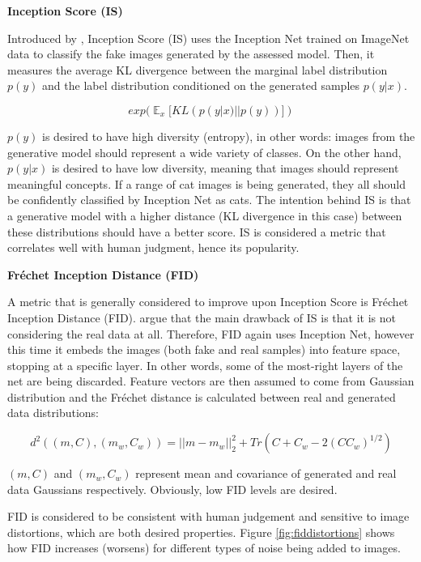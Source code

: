 \documentclass[
]{krantz}
\renewenvironment{quote}{\begin{VF}}{\end{VF}}
\begin{document}
\textbf{Inception Score (IS)}

Introduced by \citet{InceptionScore2016}, Inception Score (IS) uses the Inception Net \citep{InceptionNet2015} trained on ImageNet data to classify the fake images generated by the assessed model. Then, it measures the average KL divergence between the marginal label distribution \(p(y)\) and the label distribution conditioned on the generated samples \(p(y|x)\).

\begin{quote}
\[exp(\mathop{{}\mathbb{E}}_{x}[KL(p(y|x) || p(y))])\]
\end{quote}

\(p(y)\) is desired to have high diversity (entropy), in other words: images from the generative model should represent a wide variety of classes. On the other hand, \(p(y|x)\) is desired to have low diversity, meaning that images should represent meaningful concepts. If a range of cat images is being generated, they all should be confidently classified by Inception Net as cats. The intention behind IS is that a generative model with a higher distance (KL divergence in this case) between these distributions should have a better score. IS is considered a metric that correlates well with human judgment, hence its popularity.

\textbf{Fréchet Inception Distance (FID)}

A metric that is generally considered to improve upon Inception Score is Fréchet Inception Distance (FID). \citet{FID2017} argue that the main drawback of IS is that it is not considering the real data at all. Therefore, FID again uses Inception Net, however this time it embeds the images (both fake and real samples) into feature space, stopping at a specific layer. In other words, some of the most-right layers of the net are being discarded. Feature vectors are then assumed to come from Gaussian distribution and the Fréchet distance is calculated between real and generated data distributions:

\begin{quote}
\[d^2((m, C), (m_{w}, C_{w})) = ||m-m_{w}||_{2}^2 + Tr(C+C_{w}-2(CC_{w})^{1/2})\]
\end{quote}

\((m, C)\) and \((m_{w}, C_{w})\) represent mean and covariance of generated and real data Gaussians respectively. Obviously, low FID levels are desired.

FID is considered to be consistent with human judgement and sensitive to image distortions, which are both desired properties. Figure \ref{fig:fiddistortions} shows how FID increases (worsens) for different types of noise being added to images.
\end{document}

